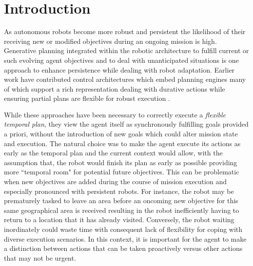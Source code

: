 \section{Introduction}
\label{sec:intro}

As autonomous robots become more robust and persistent the likelihood
of their receiving new or modified objectives during an ongoing
mission is high. Generative planning integrated within the robotic
architecture to fulfill current or such evolving agent objectives and
to deal with unanticipated situations is one approach to enhance
persistence while dealing with robot adaptation.  Earlier work
\cite{AmbrosIngerson88,Haigh98,alami:1998p820,mus98,chien99,mus04,py10}
have contributed control architectures which embed planning engines
many of which support a rich representation dealing with durative
actions while ensuring partial plans are flexible for robust execution
\cite{lemai-chenevier2004}.


While these approaches have been necessary to correctly execute a
\emph{flexible temporal plan}, they view the agent itself as
synchronously fulfilling goals provided a priori, without the
introduction of new goals which could alter mission state and
execution.
The natural choice was to make the agent execute its actions as early
as the temporal plan and the current context would allow, with the
assumption that, the robot would finish its plan as early as possible
providing more ``temporal room" for potential future objectives.  This
can be problematic when new objectives are added during the course of
mission execution and especially pronounced with persistent
robots. For instance, the robot may be prematurely tasked to leave an
area before an oncoming new objective for this same geographical area
is received resulting in the robot inefficiently having to return to a
location that it has already visited. Conversely, the robot waiting
inordinately could waste time with consequent lack of flexibility for
coping with diverse execution scenarios. In this context, it is
important for the agent to make a distinction between actions that can
be taken proactively versus other actions that may not be urgent.

